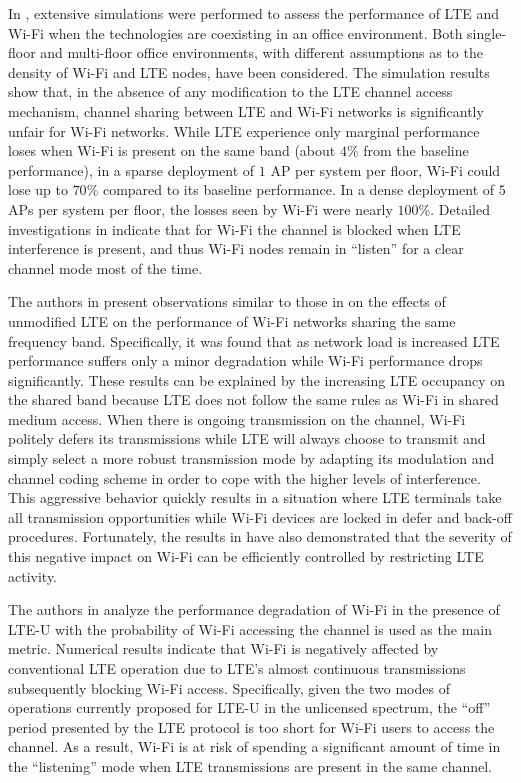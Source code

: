 In \cite{original-LTE-Wi-Fi-VTC-2013}, extensive simulations were performed to assess the performance of LTE and \mbox{Wi-Fi} when the technologies are coexisting in an office environment. Both single-floor and multi-floor office environments, with different assumptions as to the density of \mbox{Wi-Fi} and LTE nodes, have been considered. The simulation results show that, in the absence of any modification to the LTE channel access mechanism, channel sharing between LTE and \mbox{Wi-Fi} networks is significantly unfair for \mbox{Wi-Fi} networks. While LTE experience only marginal performance loses when \mbox{Wi-Fi} is present on the same band (about $4$\% from the baseline performance), in a sparse deployment of $1$ AP per system per floor, \mbox{Wi-Fi} could lose up to $70$\% compared to its baseline performance.  In a dense deployment of $5$ APs per system per floor, the losses seen by \mbox{Wi-Fi} were nearly $100$\%. Detailed investigations in \cite{original-LTE-Wi-Fi-VTC-2013} indicate that for \mbox{Wi-Fi} the channel is blocked when LTE interference is present, and thus \mbox{Wi-Fi} nodes remain in ``listen'' for a clear channel mode most of the time.

The authors in \cite{original-LTE-Wi-Fi-WCNC-2013} present observations similar to those in \cite{original-LTE-Wi-Fi-VTC-2013} on the effects of unmodified LTE on the performance of \mbox{Wi-Fi} networks sharing the same frequency band. Specifically, it was found that as network load is increased LTE performance suffers only a minor degradation while \mbox{Wi-Fi} performance drops significantly. These results can be explained by the increasing LTE occupancy on the shared band because LTE does not follow the same rules as \mbox{Wi-Fi} in shared medium access. When there is ongoing transmission on the channel, \mbox{Wi-Fi} politely defers its transmissions while LTE will always choose to transmit and simply select a more robust transmission mode by adapting its modulation and channel coding scheme in order to cope with the higher levels of interference. This aggressive behavior quickly results in a situation where LTE terminals take all transmission opportunities while \mbox{Wi-Fi} devices are locked in defer and back-off procedures. Fortunately, the results in \cite{original-LTE-Wi-Fi-WCNC-2013} have also demonstrated that the severity of this negative impact on \mbox{Wi-Fi} can be efficiently controlled by restricting LTE activity.

The authors in \cite{LTE-U-PIMRC-2014} analyze the performance degradation of \mbox{Wi-Fi} in the presence of \mbox{LTE-U} with the probability of \mbox{Wi-Fi} accessing the channel is used as the main metric. Numerical results indicate that \mbox{Wi-Fi} is negatively affected by conventional LTE operation due to LTE's almost continuous transmissions subsequently blocking \mbox{Wi-Fi} access. Specifically, given the two modes of operations currently proposed for \mbox{LTE-U} in the unlicensed spectrum, the ``off'' period presented by the LTE protocol is too short for \mbox{Wi-Fi} users to access the channel. As a result, \mbox{Wi-Fi} is at risk of spending a significant amount of time in the ``listening'' mode when LTE transmissions are present in the same channel.

